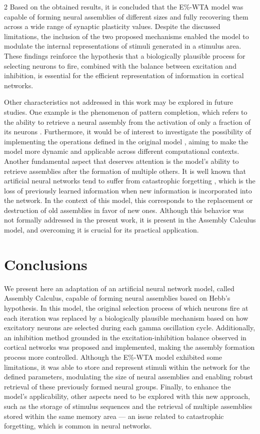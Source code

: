 \documentclass[a4paper, 10pt]{article}
\begin{document}
\begin{multicols}{2}
Based on the obtained results, it is concluded that the E\%-WTA model was capable of forming neural assemblies of different sizes and fully recovering them across a wide range of synaptic plasticity values. Despite the discussed limitations, the inclusion of the two proposed mechanisms enabled the model to modulate the internal representations of stimuli generated in a stimulus area. These findings reinforce the hypothesis that a biologically plausible process for selecting neurons to fire, combined with the balance between excitation and inhibition, is essential for the efficient representation of information in cortical networks.

Other characteristics not addressed in this work may be explored in future studies. One example is the phenomenon of pattern completion, which refers to the ability to retrieve a neural assembly from the activation of only a fraction of its neurons \cite{Yuste_2024}. Furthermore, it would be of interest to investigate the possibility of implementing the operations defined in the original model \cite{christos}, aiming to make the model more dynamic and applicable across different computational contexts. Another fundamental aspect that deserves attention is the model’s ability to retrieve assemblies after the formation of multiple others. It is well known that artificial neural networks tend to suffer from catastrophic forgetting \cite{Kirkpatrick_2017}, which is the loss of previously learned information when new information is incorporated into the network. In the context of this model, this corresponds to the replacement or destruction of old assemblies in favor of new ones. Although this behavior was not formally addressed in the present work, it is present in the Assembly Calculus model, and overcoming it is crucial for its practical application.
\section*{Conclusions}

We present here an adaptation of an artificial neural network model, called Assembly Calculus, capable of forming neural assemblies based on Hebb’s hypothesis. In this model, the original selection process of which neurons fire at each iteration was replaced by a biologically plausible mechanism based on how excitatory neurons are selected during each gamma oscillation cycle. Additionally, an inhibition method grounded in the excitation-inhibition balance observed in cortical networks was proposed and implemented, making the assembly formation process more controlled. Although the E\%-WTA model exhibited some limitations, it was able to store and represent stimuli within the network for the defined parameters, modulating the size of neural assemblies and enabling robust retrieval of these previously formed neural groups. Finally, to enhance the model’s applicability, other aspects need to be explored with this new approach, such as the storage of stimulus sequences and the retrieval of multiple assemblies stored within the same memory area — an issue related to catastrophic forgetting, which is common in neural networks.




\end{multicols}
\end{document}
